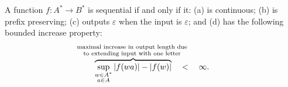 \begin{theorem}\label{thm:sequential-function-independent}
    A function $f : A^* \to B^*$ is  sequential if and only if it: (a) is continuous; (b) is prefix preserving; (c) outputs $\varepsilon$ when the input is $\varepsilon$; and (d) has the following bounded increase property:
        \begin{align*}
        \myoverbrace{\sup_{\substack{w \in A^* \\ a \in A}} |f(wa)| - |f(w)|}{maximal increase in output length due \\ to extending input with  one letter} \quad < \quad \infty.
        \end{align*}
\end{theorem}

